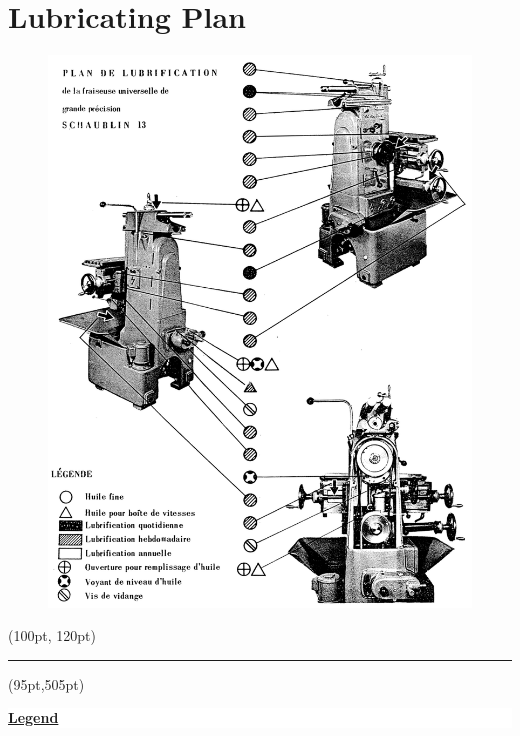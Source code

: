 \chapter{Lubricating Plan}

\begin{figure}[ht]
    \centering
    \includegraphics[width=0.9\linewidth]{images/page_59_lubrication_plan}
    \label{fig:lubricating_plan}
\end{figure}

\begin{textblock*}{6cm}(100pt, 120pt)
    \colorbox{white}{\textcolor{white}{\rule{6cm}{2cm}}}
\end{textblock*}

\begin{textblock*}{3.3cm}(95pt,505pt)
    \colorbox{white}{\parbox{\linewidth}{\uline{\textbf{Legend}}}\vspace{2pt}}
\end{textblock*}

\newcommand{\legendBlock}[2]{%
    \begin{textblock*}{4.5cm}(128pt,#1)
        \colorbox{white}{\parbox{\linewidth}{\small #2}\vspace{2pt}}
    \end{textblock*}%
}

